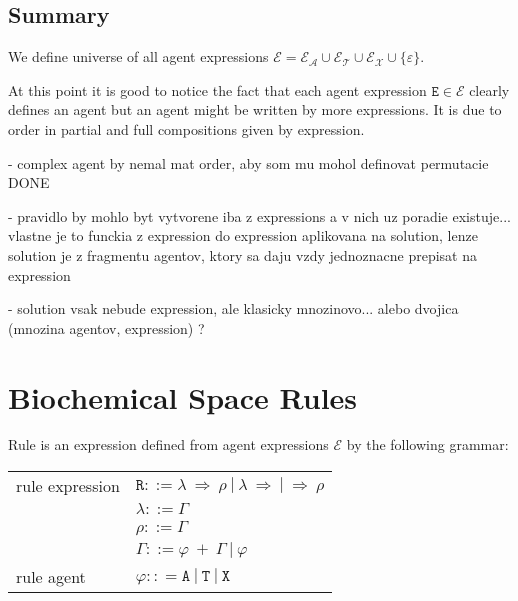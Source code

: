 \documentclass{entcs}
\renewcommand{\~}[0]{\texttildelow}
\begin{document}
\subsection{Summary}

\begin{theorem}
We define universe of all agent expressions $\mathcal{E} = \mathcal{E}_\mathcal{A} \cup \mathcal{E}_\mathcal{T} \cup \mathcal{E}_\mathcal{X} \cup \{\varepsilon\}$.
\end{theorem}

At this point it is good to notice the fact that each agent expression $\mathtt{E} \in \mathcal{E}$ clearly defines an agent but an agent might be written by more expressions. It is due to order in partial and full compositions given by expression.

- complex agent by nemal mat order, aby som mu mohol definovat permutacie DONE

- pravidlo by mohlo byt vytvorene iba z expressions a v nich uz poradie existuje... vlastne je to funckia z expression do expression aplikovana na solution, lenze solution je z fragmentu agentov, ktory sa daju vzdy jednoznacne prepisat na expression

- solution vsak nebude expression, ale klasicky mnozinovo... alebo dvojica (mnozina agentov, expression) ?

\section{Biochemical Space Rules}


Rule is an expression defined from agent expressions $\mathcal{E}$ by the following grammar:

\begin{center}
{\small
\hspace*{-1cm}\begin{tabular}{ l l }
 rule expression & $\mathtt{R} ::= \lambda ~\Rightarrow~ \rho ~|~ \lambda ~\Rightarrow ~|~ \Rightarrow~ \rho $\\
  & $\lambda ::= \Gamma$\\
  & $\rho ::= \Gamma$\\
  & $\Gamma ::= \varphi~ +~\Gamma ~|~ \varphi$\\
 rule agent & $\varphi :: = \mathtt{A}~|~\mathtt{T}~|~\mathtt{X}$\\
\end{tabular}
}
\end{center}
\end{document}
